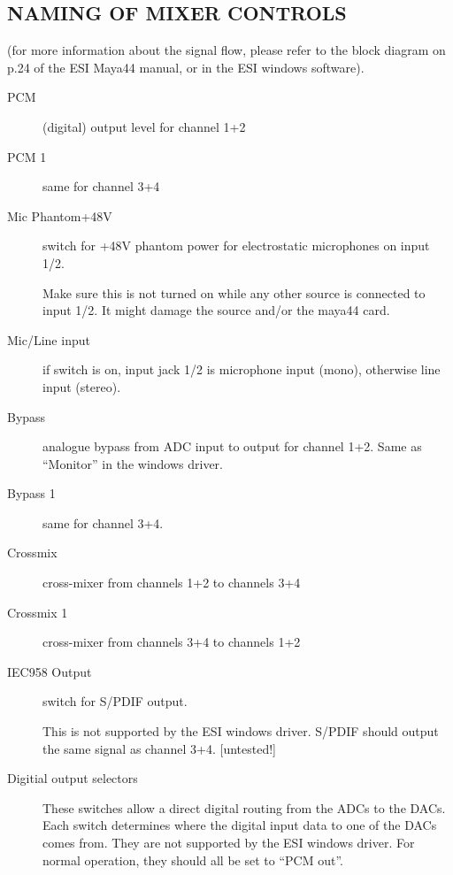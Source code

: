 \documentclass[a4paper,8pt,english]{sphinxmanual}
\begin{document}
\subsection{NAMING OF MIXER CONTROLS}
\label{sound/cards/maya44:naming-of-mixer-controls}
(for more information about the signal flow, please refer to the block diagram on p.24 of the ESI Maya44 manual, or in the ESI windows software).
\begin{description}
\item[{PCM}] \leavevmode
(digital) output level for channel 1+2

\item[{PCM 1}] \leavevmode
same for channel 3+4

\item[{Mic Phantom+48V}] \leavevmode
switch for +48V phantom power for electrostatic microphones on input 1/2.

Make sure this is not turned on while any other source is connected to input 1/2.
It might damage the source and/or the maya44 card.

\item[{Mic/Line input}] \leavevmode
if switch is on, input jack 1/2 is microphone input (mono), otherwise line input (stereo).

\item[{Bypass}] \leavevmode
analogue bypass from ADC input to output for channel 1+2. Same as ``Monitor'' in the windows driver.

\item[{Bypass 1}] \leavevmode
same for channel 3+4.

\item[{Crossmix}] \leavevmode
cross-mixer from channels 1+2 to channels 3+4

\item[{Crossmix 1}] \leavevmode
cross-mixer from channels 3+4 to channels 1+2

\item[{IEC958 Output}] \leavevmode
switch for S/PDIF output.

This is not supported by the ESI windows driver.
S/PDIF should output the same signal as channel 3+4. {[}untested!{]}

\item[{Digitial output selectors}] \leavevmode
These switches allow a direct digital routing from the ADCs to the DACs.
Each switch determines where the digital input data to one of the DACs comes from.
They are not supported by the ESI windows driver.
For normal operation, they should all be set to ``PCM out''.


\end{description}
\end{document}
